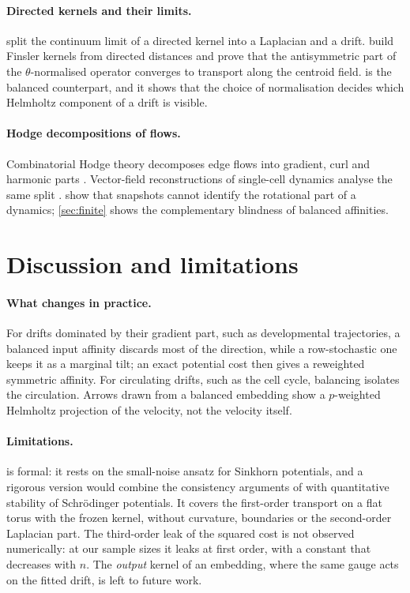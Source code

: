 \documentclass{article}
\theoremstyle{plain}
\theoremstyle{definition}
\theoremstyle{remark}
\newcommand{\1}{\mathbf{1}}
\begin{document}
\paragraph{Directed kernels and their limits.}
\citet{perraultjoncas2011directed} split the continuum limit of a directed
kernel into a Laplacian and a drift. \citet{debaussart2026finslerian} build
Finsler kernels from directed distances and prove that the antisymmetric
part of the $\theta$-normalised operator converges to transport along the
centroid field.  is the balanced counterpart, and it
shows that the choice of normalisation decides which Helmholtz component of
a drift is visible.

\paragraph{Hodge decompositions of flows.}
Combinatorial Hodge theory decomposes edge flows into gradient, curl and
harmonic parts \citep{jiang2011statistical,lim2020hodge}. Vector-field
reconstructions of single-cell dynamics analyse the same split
\citep{qiu2022mapping}. \citet{weinreb2018fundamental} show that snapshots
cannot identify the rotational part of a dynamics; \cref{sec:finite} shows
the complementary blindness of balanced affinities.

\section{Discussion and limitations}
\label{sec:discussion}

\paragraph{What changes in practice.}
For drifts dominated by their gradient part, such as developmental
trajectories, a balanced input affinity discards most of the direction,
while a row-stochastic one keeps it as a marginal tilt; an exact
potential cost then gives a reweighted symmetric affinity. For
circulating drifts, such as the cell cycle, balancing isolates the
circulation. Arrows drawn from a balanced embedding show a $p$-weighted
Helmholtz projection of the velocity, not the velocity itself.

\paragraph{Limitations.}
 is formal: it rests on the small-noise ansatz for
Sinkhorn potentials, and a rigorous version would combine the consistency
arguments of \citet{debaussart2026finslerian} with quantitative stability
of Schr\"odinger potentials. It covers the first-order transport on a flat
torus with the frozen kernel, without curvature, boundaries or the
second-order Laplacian part. The third-order leak of the squared cost is
not observed numerically: at our sample sizes it leaks at first order,
with a constant that decreases with $n$. The \emph{output} kernel of an embedding, where
the same gauge acts on the fitted drift, is left to future work.




\newpage
\appendix
\onecolumn

\end{document}
